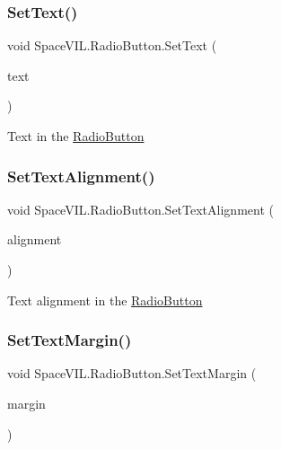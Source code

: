 \subsubsection{\texorpdfstring{Set\+Text()}{SetText()}}
{\footnotesize\ttfamily void Space\+V\+I\+L.\+Radio\+Button.\+Set\+Text (\begin{DoxyParamCaption}\item[{String}]{text }\end{DoxyParamCaption})}



Text in the \mbox{\hyperlink{class_space_v_i_l_1_1_radio_button}{Radio\+Button}} 

\mbox{\label{class_space_v_i_l_1_1_radio_button_abf15acaa5c91ecb00c68b660affc39ab}} 
\subsubsection{\texorpdfstring{Set\+Text\+Alignment()}{SetTextAlignment()}}
{\footnotesize\ttfamily void Space\+V\+I\+L.\+Radio\+Button.\+Set\+Text\+Alignment (\begin{DoxyParamCaption}\item[{Item\+Alignment}]{alignment }\end{DoxyParamCaption})}



Text alignment in the \mbox{\hyperlink{class_space_v_i_l_1_1_radio_button}{Radio\+Button}} 

\mbox{\label{class_space_v_i_l_1_1_radio_button_a690a5887128bceef1742933f1078c44c}} 
\subsubsection{\texorpdfstring{Set\+Text\+Margin()}{SetTextMargin()}}
{\footnotesize\ttfamily void Space\+V\+I\+L.\+Radio\+Button.\+Set\+Text\+Margin (\begin{DoxyParamCaption}\item[{\mbox{\hyperlink{struct_space_v_i_l_1_1_decorations_1_1_indents}{Indents}}}]{margin }\end{DoxyParamCaption})}




